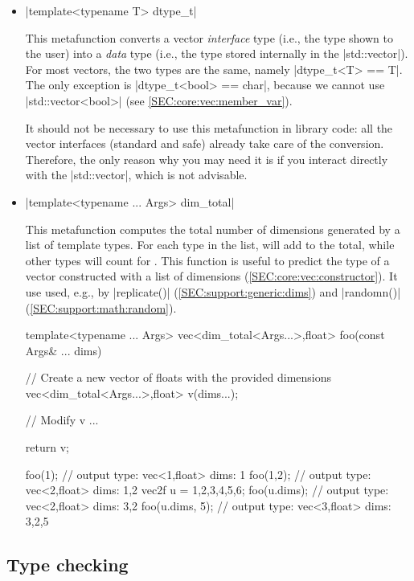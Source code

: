 \documentclass[12pt,a4paper]{report}
\newcommand{\stdvec}{\cppinline|std::vector|\xspace}
\newenvironment{example}
{
    \begin{mdframed}[style=example,frametitle={Example}]
}
{
    \end{mdframed}
}
\begin{document}
\begin{itemize}
\item \cppinline|template<typename T> dtype_t|

This metafunction converts a vector \emph{interface} type (i.e., the type shown to the user) into a \emph{data} type (i.e., the type stored internally in the \stdvec). For most vectors, the two types are the same, namely \cppinline|dtype_t<T> == T|. The only exception is \cppinline|dtype_t<bool> == char|, because we cannot use \cppinline|std::vector<bool>| (see \ref{SEC:core:vec:member_var}).

It should not be necessary to use this metafunction in library code: all the vector interfaces (standard and safe) already take care of the conversion. Therefore, the only reason why you may need it is if you interact directly with the \stdvec, which is not advisable.

\item \cppinline|template<typename ... Args> dim_total|

This metafunction computes the total number of dimensions generated by a list of template types. For each type in the list,  will add  to the total, while other types will count for . This function is useful to predict the type of a vector constructed with a list of dimensions (\ref{SEC:core:vec:constructor}). It use used, e.g., by \cppinline|replicate()| (\ref{SEC:support:generic:dims}) and \cppinline|randomn()| (\ref{SEC:support:math:random}).

\begin{example}
\begin{cppcode}
template<typename ... Args>
vec<dim_total<Args...>,float> foo(const Args& ... dims) {
    // Create a new vector of floats with the provided dimensions
    vec<dim_total<Args...>,float> v(dims...);

    // Modify v ...

    return v;
}

foo(1);         // output type: vec<1,float> dims: {1}
foo(1,2);       // output type: vec<2,float> dims: {1,2}
vec2f u = {{1,2},{3,4},{5,6}};
foo(u.dims);    // output type: vec<2,float> dims: {3,2}
foo(u.dims, 5); // output type: vec<3,float> dims: {3,2,5}
\end{cppcode}
\end{example}

\end{itemize}

\subsection{Type checking}
\end{document}
